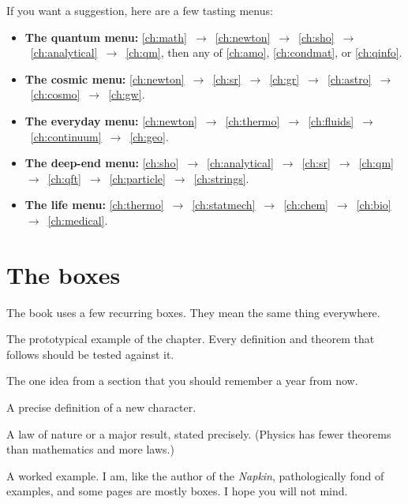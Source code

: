 If you want a suggestion, here are a few tasting menus:
\begin{itemize}[itemsep=3pt]
  \item \textbf{The quantum menu:} \ref{ch:math}~$\to$~\ref{ch:newton}~$\to$~\ref{ch:sho}~$\to$~\ref{ch:analytical}~$\to$~\ref{ch:qm}, then any of \ref{ch:amo}, \ref{ch:condmat}, or \ref{ch:qinfo}.
  \item \textbf{The cosmic menu:} \ref{ch:newton}~$\to$~\ref{ch:sr}~$\to$~\ref{ch:gr}~$\to$~\ref{ch:astro}~$\to$~\ref{ch:cosmo}~$\to$~\ref{ch:gw}.
  \item \textbf{The everyday menu:} \ref{ch:newton}~$\to$~\ref{ch:thermo}~$\to$~\ref{ch:fluids}~$\to$~\ref{ch:continuum}~$\to$~\ref{ch:geo}.
  \item \textbf{The deep-end menu:} \ref{ch:sho}~$\to$~\ref{ch:analytical}~$\to$~\ref{ch:sr}~$\to$~\ref{ch:qm}~$\to$~\ref{ch:qft}~$\to$~\ref{ch:particle}~$\to$~\ref{ch:strings}.
  \item \textbf{The life menu:} \ref{ch:thermo}~$\to$~\ref{ch:statmech}~$\to$~\ref{ch:chem}~$\to$~\ref{ch:bio}~$\to$~\ref{ch:medical}.
\end{itemize}

\section*{The boxes}

The book uses a few recurring boxes. They mean the same thing everywhere.

\begin{prototype}
The prototypical example of the chapter. Every definition and theorem that follows should be tested against it.
\end{prototype}

\begin{keyidea}
The one idea from a section that you should remember a year from now.
\end{keyidea}

\begin{definition}
A precise definition of a new character.
\end{definition}

\begin{law}
A law of nature or a major result, stated precisely. (Physics has fewer theorems than mathematics and more laws.)
\end{law}

\begin{example}
A worked example. I am, like the author of the \emph{Napkin}, pathologically fond of examples, and some pages are mostly boxes. I hope you will not mind.
\end{example}

